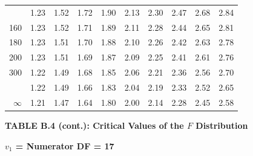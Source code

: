 \documentclass[10pt]{article}
\begin{document}
\begin{longtable}{@{}r!{\vrule width 0.8pt\hspace{0.55em}}rrrrrrrrr@{}}
 & 1.23 & 1.52 & 1.72 & 1.90 & 2.13 & 2.30 & 2.47 & 2.68 & 2.84 \\
160 & 1.23 & 1.52 & 1.71 & 1.89 & 2.11 & 2.28 & 2.44 & 2.65 & 2.81 \\
180 & 1.23 & 1.51 & 1.70 & 1.88 & 2.10 & 2.26 & 2.42 & 2.63 & 2.78 \\
200 & 1.23 & 1.51 & 1.69 & 1.87 & 2.09 & 2.25 & 2.41 & 2.61 & 2.76 \\
300 & 1.22 & 1.49 & 1.68 & 1.85 & 2.06 & 2.21 & 2.36 & 2.56 & 2.70 \\
 & 1.22 & 1.49 & 1.66 & 1.83 & 2.04 & 2.19 & 2.33 & 2.52 & 2.65 \\
$\infty$ & 1.21 & 1.47 & 1.64 & 1.80 & 2.00 & 2.14 & 2.28 & 2.45 & 2.58 \\
\end{longtable}
\newpage
\thispagestyle{empty}
\begin{center}
{\large\bfseries TABLE B.4 (cont.): Critical Values of the $F$ Distribution\par}
\end{center}
{\large\bfseries $v_1$ = Numerator DF = 17\par}
\vspace{0.5em}
\small
\end{document}
